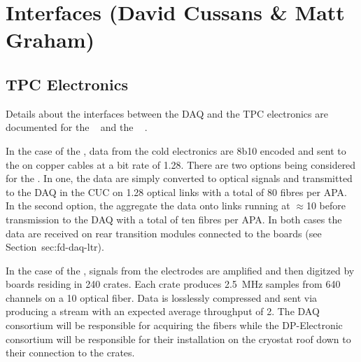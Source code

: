 
\section{Interfaces (David Cussans \& Matt Graham)}
\label{sec:fd-daq-intfc}



\subsection{TPC Electronics}
\label{sec:fd-daq-intfc-elec}

Details about the interfaces between the DAQ and the TPC electronics
are documented for the ~\cite{docdb6742} and the
~\cite{docdb6778} .

In the case of the  , data from the cold
electronics  are 8b10 encoded and sent to the
 on copper cables at a bit rate of \SI{1.28}{\Gbps}. There
are two options being considered for the . In one, the
data are simply converted to optical signals and transmitted to the
DAQ in the CUC on \SI{1.28}{\Gbps} optical links with a total of 80
fibres per APA. In the second option, the  aggregate the
data onto links running at $\approx$\SI{10}{\Gbps} before transmission
to the DAQ with a total of ten fibres per APA. In both cases the data
are received on rear transition modules connected to the 
 boards (see Section~{sec:fd-daq-ltr}).

In the case of the  , signals from the
 electrodes are amplified and then digitzed by 
boards residing in 240  crates. 
Each crate produces \SI{2.5}{\MHz} samples from 640 channels on a
\SI{10}{\Gbps} optical fiber. 
Data is losslessly compressed and sent via  producing a
stream with an expected average throughput of \SI{2}{\Gbps}.
The DAQ consortium will be responsible for acquiring the fibers while
the DP-Electronic consortium will be responsible for their
installation on the cryostat roof down to their connection to the
 crates.

